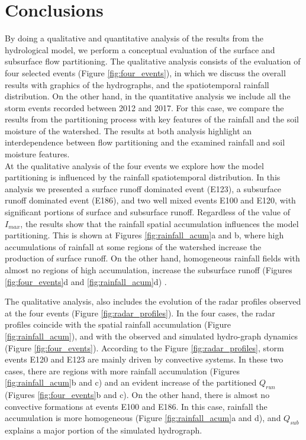 \documentclass[preprint,12pt]{elsarticle}
\begin{document}
\section{Conclusions}

By doing a qualitative and quantitative analysis of the results from the hydrological model, we perform a conceptual evaluation of the surface and subsurface flow partitioning.  The qualitative analysis consists of the evaluation of four selected events (Figure \ref{fig:four_events}), in which we discuss the overall results with graphics of the hydrographs, and the spatiotemporal rainfall distribution.  On the other hand, in the quantitative analysis we include all the storm events recorded between 2012 and 2017.  For this case, we compare the results from the partitioning process with key features of the rainfall and the soil moisture of the watershed.  The results at both analysis highlight an interdependence between flow partitioning and the examined rainfall and soil moisture features.\\

At the qualitative analysis of the four events we explore how the model partitioning is influenced by the rainfall spatiotemporal distribution.  In this analysis we presented a surface runoff dominated event (E123), a subsurface runoff dominated event (E186), and two well mixed events E100 and E120, with significant portions of surface and subsurface runoff.   Regardless of the value of $I_{max}$, the results show that the rainfall spatial accumulation  influences the model partitioning. This is shown at Figures \ref{fig:rainfall_acum}a and b, where high accumulations of rainfall at some regions of the watershed increase the production of surface runoff.  On the other hand, homogeneous rainfall fields with almost no regions of high accumulation, increase the subsurface runoff (Figures \ref{fig:four_events}d and \ref{fig:rainfall_acum}d) .  

The qualitative analysis, also includes the evolution of the radar profiles observed at the four events (Figure \ref{fig:radar_profiles}).  In the four cases, the radar profiles coincide with the spatial rainfall accumulation (Figure \ref{fig:rainfall_acum}), and with the observed and simulated hydro-graph dynamics (Figure \ref{fig:four_events}).  According to the Figure \ref{fig:radar_profiles}, storm events E120 and E123 are mainly driven by convective systems. In these two cases, there are regions with more rainfall accumulation (Figures \ref{fig:rainfall_acum}b and c) and an evident increase of the partitioned $Q_{run}$ (Figures \ref{fig:four_events}b and c).   On the other hand, there is almost no convective formations at events E100 and E186.  In this case, rainfall the accumulation is more homogeneous (Figure \ref{fig:rainfall_acum}a and d), and $Q_{sub}$ explains a major portion of the simulated hydrograph.
\end{document}
